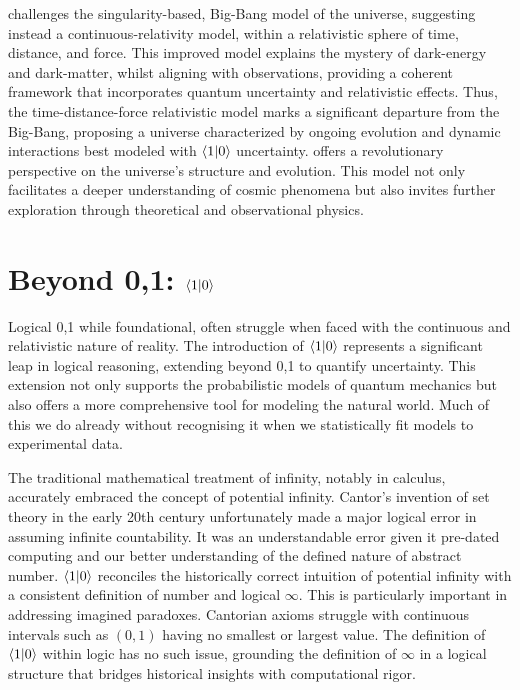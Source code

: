 \documentclass[12pt]{article}
\begin{document}
\iR{} challenges the singularity-based, Big-Bang model of the universe, suggesting instead a continuous-relativity model, within a relativistic \iR{} sphere of time, distance, and force. This improved model explains the mystery of dark-energy and dark-matter, whilst aligning with observations, providing a coherent framework that incorporates quantum uncertainty and relativistic effects. Thus, the \iR{} time-distance-force relativistic model marks a significant departure from the Big-Bang, proposing a universe characterized by ongoing evolution and dynamic interactions best modeled with \(\langle 1 | 0 \rangle\) uncertainty. \iR{} offers a revolutionary perspective on the universe's structure and evolution. This model not only facilitates a deeper understanding of cosmic phenomena but also invites further exploration through theoretical and observational physics.

\section*{Beyond {0,1}: \(\langle 1 | 0 \rangle\)}
Logical {0,1} while foundational, often struggle when faced with the continuous and relativistic nature of reality. The introduction of \(\langle 1 | 0 \rangle\) represents a significant leap in logical reasoning, extending beyond {0,1} to quantify uncertainty. This extension not only supports the probabilistic models of quantum mechanics but also offers a more comprehensive tool for modeling the natural world. Much of this we do already without recognising it when we statistically fit models to experimental data.

The traditional mathematical treatment of infinity, notably in calculus, accurately embraced the concept of potential infinity. Cantor's invention of set theory in the early 20th century unfortunately made a major logical error in assuming infinite countability. It was an understandable error given it pre-dated computing and our better understanding of the defined nature of abstract number. \(\langle 1 | 0 \rangle\) reconciles the historically correct intuition of potential infinity with a consistent definition of number and logical \(\infty\). This is particularly important in addressing imagined paradoxes. Cantorian axioms struggle with continuous intervals such as \((0,1)\) having no smallest or largest value. The definition of \(\langle 1 | 0 \rangle\) within logic has no such issue, grounding the definition of \(\infty\) in a logical structure that bridges historical insights with computational rigor.
\end{document}
